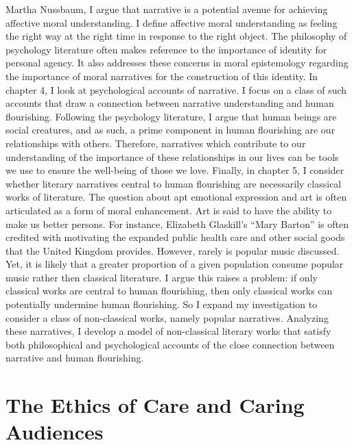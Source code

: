 \documentclass[phdthesis,12pt,final]{wuthesis}
\theoremstyle{definition}
\theoremstyle{definition}
\theoremstyle{definition}
\theoremstyle{definition}
\theoremstyle{remark}
\begin{document}
Martha Nussbaum, I argue that narrative is a potential avenue for achieving affective moral understanding. I define affective moral understanding as feeling the right way at the right time in response to the right object. The philosophy of psychology literature often makes reference to the importance of identity for personal agency. It also addresses these concerns in moral epistemology regarding the importance of moral narratives for the construction of this identity. In chapter 4, I look at psychological accounts of narrative. I focus on a class of such accounts that draw a connection between narrative understanding and human flourishing. Following the psychology literature, I argue that human beings are social creatures, and as such, a prime component in human flourishing are our relationships with others. Therefore, narratives which contribute to our understanding of the importance of these relationships in our lives can be tools we use to ensure the well-being of those we love. Finally, in chapter 5, I consider whether literary narratives central to human flourishing are necessarily classical works of literature. The question about apt emotional expression and art is often articulated as a form of moral enhancement. Art is said to have the ability to make us better persons. For instance, Elizabeth Glaskill's ``Mary Barton'' is often credited with motivating the expanded public health care and other social goods that the United Kingdom provides. However, rarely is popular music discussed. Yet, it is likely that a greater proportion of a given population consume popular music rather then classical literature. I argue this raises a problem: if only classical works are central to human flourishing, then only classical works can potentially undermine human flourishing. So I expand my investigation to consider a class of non-classical works, namely popular narratives. Analyzing these narratives, I develop a model of non-classical literary works that satisfy both philosophical and psychological accounts of the close connection between narrative and human flourishing.

\section{The Ethics of Care and Caring Audiences}\label{the-ethics-of-care-and-caring-audiences}
\end{document}
